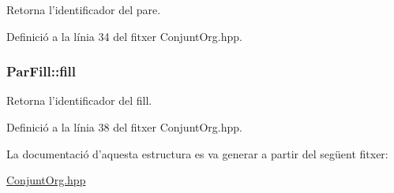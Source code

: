 Retorna l'identificador del pare. 



Definició a la línia 34 del fitxer Conjunt\-Org.\-hpp.

\hypertarget{struct_par_fill_af35c09c217a6bc97860535cc395ebc94}{
\subsubsection[{fill}]{\setlength{\rightskip}{0pt plus 5cm}Par\-Fill\-::fill}}\label{struct_par_fill_af35c09c217a6bc97860535cc395ebc94}


Retorna l'identificador del fill. 



Definició a la línia 38 del fitxer Conjunt\-Org.\-hpp.



La documentació d'aquesta estructura es va generar a partir del següent fitxer\-:\begin{DoxyCompactItemize}
\item 
\hyperlink{_conjunt_org_8hpp}{Conjunt\-Org.\-hpp}\end{DoxyCompactItemize}
